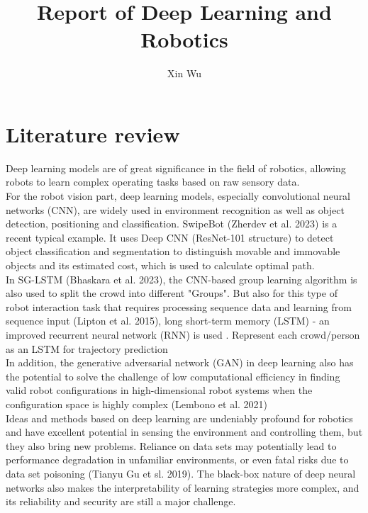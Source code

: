 \documentclass[12pt]{article}
\title{Report of Deep Learning and Robotics}
\author{Xin Wu}
\begin{document}
\maketitle

\section{Literature review}
Deep learning models are of great significance in the field of robotics, allowing robots to learn complex operating tasks based on raw sensory data.\\

For the robot vision part, deep learning models, especially convolutional neural networks (CNN), are widely used in environment recognition as well as object detection, 
positioning and classification. SwipeBot\cite{SwipeBot} (Zherdev et al. 2023) is a recent typical example. It uses Deep CNN (ResNet-101 structure) to detect object classification and segmentation to distinguish movable and immovable objects and its estimated cost, 
which is used to calculate optimal path.\\

In SG-LSTM\cite{SG} (Bhaskara et al. 2023), the CNN-based group learning algorithm is also used to split the crowd into different "Groups". 
But also for this type of robot interaction task that requires processing sequence data and learning from sequence input\cite{review} (Lipton et al. 2015), 
long short-term memory (LSTM) - an improved recurrent neural network (RNN) is used . Represent each crowd/person as an LSTM for trajectory prediction\\

In addition, the generative adversarial network (GAN) in deep learning also has the potential to solve the challenge of low computational efficiency in finding 
valid robot configurations in high-dimensional robot systems when the configuration space is highly complex\cite{GAN} (Lembono et al. 2021)\\

Ideas and methods based on deep learning are undeniably profound for robotics and have excellent potential in sensing the environment and controlling them, 
but they also bring new problems. Reliance on data sets may potentially lead to performance degradation in unfamiliar environments, 
or even fatal risks due to data set poisoning\cite{BadNet} (Tianyu Gu et sl. 2019). The black-box nature of deep neural networks also makes the interpretability of learning strategies more complex, 
and its reliability and security are still a major challenge.
\end{document}
